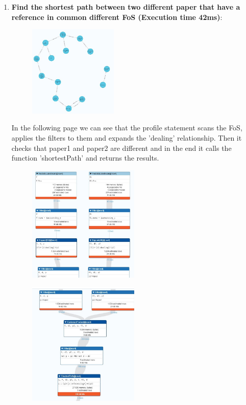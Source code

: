 \documentclass{Configuration_Files/PoliMi3i_thesis}
\begin{document}
\begin{enumerate}
\begin{figure}[H]
    \end{figure}
    \newpage
    \item \textbf{Find the shortest path between two different paper that have a reference in common different FoS (Execution time 42ms)}:
    
    \begin{figure}[H]
    \centering
    \includegraphics[width=0.4\textwidth]{Images/queries_neo4j/query_10.jpg}
    \end{figure}
  In the following page we can see that the profile statement scans the FoS, applies the filters to them and expands the 'dealing' relationship. Then it checks that paper1 and paper2 are different and in the end it calls the function 'shortestPath' and returns the results.
    \begin{figure}[H]
    \centering
    \includegraphics[width=0.5\textwidth]{Images/queries_neo4j/query_10_p1.jpg}
    \end{figure}
    \begin{figure}[H]
    \centering
    \includegraphics[width=0.5\textwidth]{Images/queries_neo4j/query_10_p2.jpg}

\end{figure}
\end{enumerate}
\end{document}
